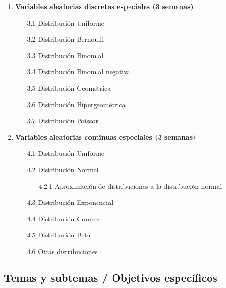 \begin{enumerate}
\item \textbf{Variables aleatorias discretas especiales (3 semanas)}
\begin{enumerate}
  \item[3.1 ] Distribuci\'on Uniforme
  \item[3.2 ] Distribuci\'on Bernoulli
  \item[3.3 ] Distribuci\'on Binomial
  \item[3.4 ] Distribuci\'on Binomial negativa
  \item[3.5 ] Distribuci\'on Geom\'etrica
  \item[3.6 ] Distribuci\'on Hipergeom\'etrica
  \item[3.7 ] Distribuci\'on Poisson
\end{enumerate}

\item \textbf{Variables aleatorias continuas especiales (3 semanas)}
\begin{enumerate}
  \item[4.1 ] Distribuci\'on Uniforme
  \item[4.2 ] Distribuci\'on Normal
  \begin{enumerate}
    \item[4.2.1 ] Aproximaci\'on de distribuciones a la distribuci\'on normal
  \end{enumerate}
  \item[4.3 ] Distribuci\'on Exponencial
  \item[4.4 ] Distribuci\'on Gamma
  \item[4.5 ] Distribuci\'on Beta
  \item[4.6 ] Otras distribuciones
\end{enumerate}

\end{enumerate}

\subsection{Temas y subtemas / Objetivos espec\'ificos}

